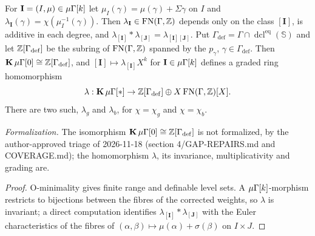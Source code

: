 \setcounter{theorem}{5}
\begin{remark}
\label{int-Gam}
\leanok
{}
For $\mathbf{I} = (I, \mu) \in \mu\Gamma[k]$ let $\mu_I(\gamma) = \mu(\gamma) + \Sigma\gamma$ on $I$ and $\lambda_{\mathbf{I}}(\gamma) = \chi(\mu_I^{-1}(\gamma))$. Then $\lambda_{\mathbf{I}} \in \operatorname{FN}(\Gamma, \mathbb{Z})$ depends only on the class $[\mathbf{I}]$, is additive in each degree, and $\lambda_{[\mathbf{I}]} * \lambda_{[\mathbf{J}]} = \lambda_{[\mathbf{I}][\mathbf{J}]}$. Put $\Gamma_{\mathrm{def}} = \Gamma \cap \operatorname{dcl}^{\mathrm{eq}}(\mathbb{S})$ and let $\mathbb{Z}[\Gamma_{\mathrm{def}}]$ be the subring of $\operatorname{FN}(\Gamma, \mathbb{Z})$ spanned by the $p_\gamma$, $\gamma \in \Gamma_{\mathrm{def}}$. Then $\operatorname{\mathbf{K}} \mu\Gamma[0] \cong \mathbb{Z}[\Gamma_{\mathrm{def}}]$, and $[\mathbf{I}] \mapsto \lambda_{[\mathbf{I}]} X^k$ for $\mathbf{I} \in \mu\Gamma[k]$ defines a graded ring homomorphism \[ \lambda : \operatorname{\mathbf{K}} \mu\Gamma[*] \to \mathbb{Z}[\Gamma_{\mathrm{def}}] \oplus X \operatorname{FN}(\Gamma, \mathbb{Z})[X]. \] There are two such, $\lambda_g$ and $\lambda_b$, for $\chi = \chi_g$ and $\chi = \chi_b$.

\emph{Formalization.} The isomorphism $\operatorname{\mathbf{K}} \mu\Gamma[0] \cong \mathbb{Z}[\Gamma_{\mathrm{def}}]$ is not formalized, by the author-approved triage of 2026-11-18 (section 4/GAP-REPAIRS.md and COVERAGE.md); the homomorphism $\lambda$, its invariance, multiplicativity and grading are.
\end{remark}

\begin{proof}
O-minimality gives finite range and definable level sets. A $\mu\Gamma[k]$-morphism restricts to bijections between the fibres of the corrected weights, so $\lambda$ is invariant; a direct computation identifies $\lambda_{[\mathbf{I}]} * \lambda_{[\mathbf{J}]}$ with the Euler characteristics of the fibres of $(\alpha, \beta) \mapsto \mu(\alpha) + \sigma(\beta)$ on $I \times J$.
\end{proof}

